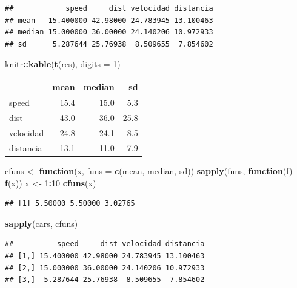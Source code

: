 \documentclass[
]{book}
\newenvironment{Shaded}{\begin{snugshade}}{\end{snugshade}}
\newcommand{\ControlFlowTok}[1]{\textcolor[rgb]{0.13,0.29,0.53}{\textbf{#1}}}
\newcommand{\DataTypeTok}[1]{\textcolor[rgb]{0.13,0.29,0.53}{#1}}
\newcommand{\DecValTok}[1]{\textcolor[rgb]{0.00,0.00,0.81}{#1}}
\newcommand{\KeywordTok}[1]{\textcolor[rgb]{0.13,0.29,0.53}{\textbf{#1}}}
\newcommand{\NormalTok}[1]{#1}
\newcommand{\OperatorTok}[1]{\textcolor[rgb]{0.81,0.36,0.00}{\textbf{#1}}}
\newcommand{\StringTok}[1]{\textcolor[rgb]{0.31,0.60,0.02}{#1}}
\begin{document}
\begin{verbatim}
##            speed     dist velocidad distancia
## mean   15.400000 42.98000 24.783945 13.100463
## median 15.000000 36.00000 24.140206 10.972933
## sd      5.287644 25.76938  8.509655  7.854602
\end{verbatim}

\begin{Shaded}
\begin{Highlighting}[]
\NormalTok{knitr}\OperatorTok{::}\KeywordTok{kable}\NormalTok{(}\KeywordTok{t}\NormalTok{(res), }\DataTypeTok{digits =} \DecValTok{1}\NormalTok{)}
\end{Highlighting}
\end{Shaded}

\begin{tabular}{l|r|r|r}
\hline
  & mean & median & sd\\
\hline
speed & 15.4 & 15.0 & 5.3\\
\hline
dist & 43.0 & 36.0 & 25.8\\
\hline
velocidad & 24.8 & 24.1 & 8.5\\
\hline
distancia & 13.1 & 11.0 & 7.9\\
\hline
\end{tabular}

\begin{Shaded}
\begin{Highlighting}[]
\NormalTok{cfuns <-}\StringTok{ }\ControlFlowTok{function}\NormalTok{(x, }\DataTypeTok{funs =} \KeywordTok{c}\NormalTok{(mean, median, sd))}
            \KeywordTok{sapply}\NormalTok{(funs, }\ControlFlowTok{function}\NormalTok{(f) }\KeywordTok{f}\NormalTok{(x))}
\NormalTok{x <-}\StringTok{ }\DecValTok{1}\OperatorTok{:}\DecValTok{10}
\KeywordTok{cfuns}\NormalTok{(x)}
\end{Highlighting}
\end{Shaded}

\begin{verbatim}
## [1] 5.50000 5.50000 3.02765
\end{verbatim}

\begin{Shaded}
\begin{Highlighting}[]
\KeywordTok{sapply}\NormalTok{(cars, cfuns)}
\end{Highlighting}
\end{Shaded}

\begin{verbatim}
##          speed     dist velocidad distancia
## [1,] 15.400000 42.98000 24.783945 13.100463
## [2,] 15.000000 36.00000 24.140206 10.972933
## [3,]  5.287644 25.76938  8.509655  7.854602
\end{verbatim}
\end{document}
